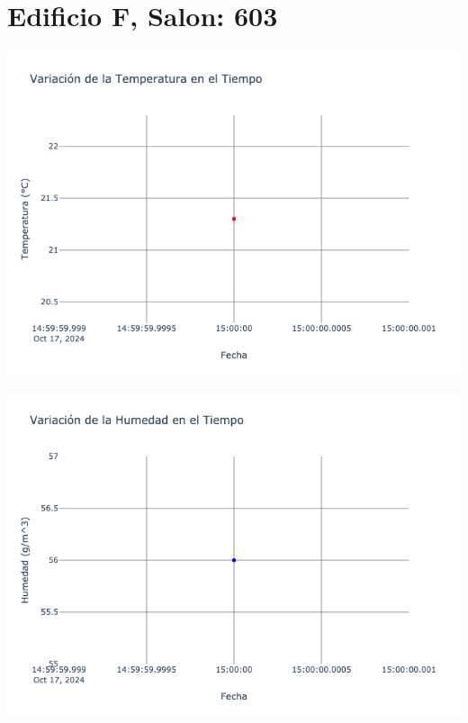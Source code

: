 \documentclass{article}
\begin{document}
    \section{Edificio F, Salon: 603}
    \noindent
    \begin{minipage}{0.48\textwidth}
        \centering
        \includegraphics[width=\textwidth]{../img/poli/TS603-90Dias-03-12-2024.png}
    \end{minipage}
    \hfill
    \begin{minipage}{0.48\textwidth}
        \centering
        \includegraphics[width=\textwidth]{../img/poli/HS603-90Dias-03-12-2024.png}
    \end{minipage}
\end{document}
